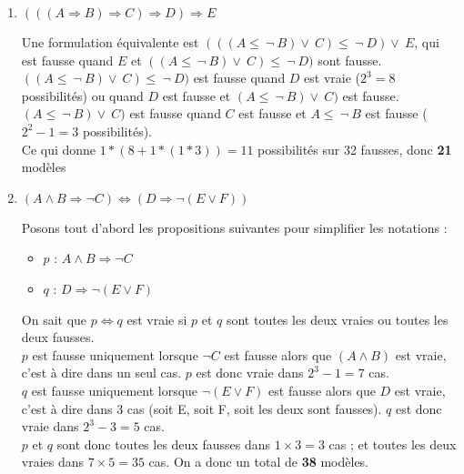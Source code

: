 \begin{enumerate}
	\item $(((A \Rightarrow B) \Rightarrow C) \Rightarrow D) \Rightarrow E$


    Une formulation équivalente est $(((A \leq\ \neg\ B) \lor\ C) \leq\ \neg\ D) \lor\ E$, qui est fausse quand $E$ et $((A \leq\ \neg\ B) \lor\ C) \leq\ \neg\ D)$ sont fausse. \\
    $((A \leq\ \neg\ B) \lor\ C) \leq\ \neg\ D)$ est fausse quand $D$ est vraie ($2^3 = 8$ possibilités) ou quand $D$ est fausse et $(A \leq\ \neg\ B) \lor\ C)$ est fausse. \\
    $(A \leq\ \neg\ B) \lor\ C)$ est fausse quand $C$ est fausse et $A \leq\ \neg\ B$ est fausse ($2^2 - 1 = 3$ possibilités).\\
    Ce qui donne $1* (8 + 1 * (1 * 3)) = 11$ possibilités sur 32 fausses, donc \textbf{21} modèles

	\item $(A \land B \Rightarrow \neg C) \Leftrightarrow (D \Rightarrow \neg(E \lor F))$

    Posons tout d'abord les propositions suivantes pour simplifier les notations :
    \begin{itemize}
        \item $p$ : $A \land B \Rightarrow \neg C$
        \item $q$ : $D \Rightarrow \neg(E \lor F)$
    \end{itemize}

    On sait que $p \Leftrightarrow q$ est vraie si $p$ et $q$ sont toutes les deux vraies ou toutes les deux fausses.\\
    $p$ est fausse uniquement lorsque $\neg C$ est fausse alors que $(A \land B)$ est vraie, c'est à dire dans un seul cas.
    $p$ est donc vraie dans $2^3-1=7$ cas.\\
    $q$ est fausse uniquement lorsque $\neg(E \lor F)$ est fausse alors que $D$ est vraie, c'est à dire dans 3 cas (soit E, soit F, soit les deux sont fausses).
    $q$ est donc vraie dans $2^3-3=5$ cas.\\
    $p$ et $q$ sont donc toutes les deux fausses dans $1 \times 3 = 3$ cas ; et toutes les deux vraies dans $7 \times 5 = 35$ cas.
    On a donc un total de \textbf{38} modèles.
\end{enumerate}
